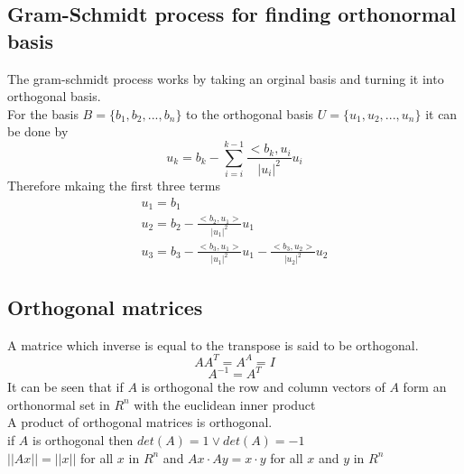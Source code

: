 \documentclass[12pt, a4paper]{article}
\begin{document}
		\subsection{Gram-Schmidt process for finding orthonormal basis}
			The gram-schmidt process works by taking an orginal basis and turning it into orthogonal basis.\\
			For the basis $B=\{b_1,b_2,...,b_n\}$ to the orthogonal basis $U=\{u_1,u_2,...,u_n\}$ it can be done by
			$$u_k=b_k-\sum\limits_{i=i}^{k-1}\frac{<b_k,u_i}{|u_i|^2}u_i$$
			Therefore mkaing the first three terms
			\begin{align}
				u_1=b_1\\
				u_2=b_2-\frac{<b_2,u_1>}{|u_1|^2}u_1\\
				u_3=b_3-\frac{<b_3,u_1>}{|u_1|^2}u_1-\frac{<b_3,u_2>}{|u_2|^2}u_2
			\end{align}
		\subsection{Orthogonal matrices}
			A matrice which inverse is equal to the transpose is said to be orthogonal.\\
			$$AA^T=A^A=I$$
			$$A^{-1}=A^T$$
			It can be seen that if $A$ is orthogonal the row and column vectors of $A$ form an orthonormal set in $R^n$ with the euclidean inner product\\
			A product of orthogonal matrices is orthogonal.\\
			if $A$ is orthogonal then $det(A)=1 \lor det(A)=-1$\\
			$||Ax||=||x||$ for all $x$ in $R^n$ and $Ax\cdot Ay=x\cdot y$ for all $x$ and $y$ in $R^n$	
\end{document}
